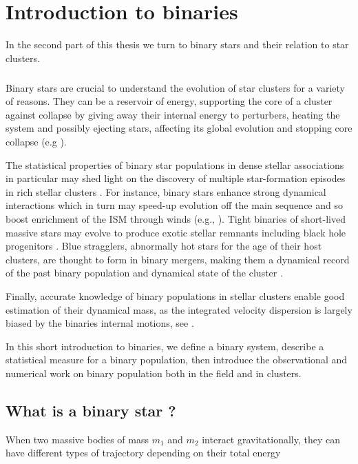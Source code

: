
\chapter{Introduction to binaries}

In the second part of this thesis we turn to binary stars and their relation to star clusters. 

\paragraph*{}
Binary stars are crucial to understand the evolution of star clusters for a variety of reasons. They can be a reservoir of energy, supporting the core of a cluster against collapse by giving away their internal energy to perturbers, heating the system and possibly ejecting stars, affecting its global evolution and stopping core collapse (e.g \citealt{Heggie1992}).

The statistical properties of binary star populations in dense stellar associations in particular may shed light on the discovery of multiple star-formation episodes in rich stellar clusters \citep{anderson2009}. For instance, binary stars enhance strong dynamical interactions which in turn may speed-up evolution off the main sequence and so boost enrichment of the ISM through winds (e.g., \citealt{Tailo2015}). Tight binaries of short-lived massive stars may evolve to produce exotic stellar remnants including black hole progenitors \citep{bacon1996,davies2009}. Blue stragglers, abnormally hot stars for the age of their host clusters, are thought to form in binary mergers, making them a dynamical record of the past binary population and dynamical state of the cluster \citep{Knigge2009}.

Finally, accurate knowledge of binary populations in stellar clusters enable good estimation of their dynamical mass, as the integrated velocity dispersion is largely biased by the binaries internal motions, see \cite{Rubenstein1997}.

In this short introduction to binaries, we define a binary system, describe a statistical measure for a binary population, then introduce the observational and numerical work on binary population both in the field and in clusters.


\section{What is a binary star ?}

When two massive bodies of mass $m_1$ and $m_2$ interact gravitationally, they can have different types of trajectory depending on their total energy

